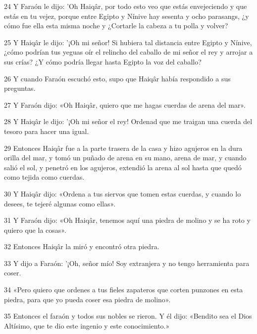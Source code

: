 \par 24 Y Faraón le dijo: 'Oh Haiqâr, por todo esto veo que estás envejeciendo y que estás en tu vejez, porque entre Egipto y Nínive hay sesenta y ocho parasangs, ¿y cómo fue ella esta misma noche y ¿Cortarle la cabeza a tu polla y volver?

\par 25 Y Haiqâr le dijo: '¡Oh mi señor! Si hubiera tal distancia entre Egipto y Nínive, ¿cómo podrían tus yeguas oír el relincho del caballo de mi señor el rey y arrojar a sus crías? ¿Y cómo podría llegar hasta Egipto la voz del caballo?

\par 26 Y cuando Faraón escuchó esto, supo que Haiqâr había respondido a sus preguntas.

\par 27 Y Faraón dijo: «Oh Haiqâr, quiero que me hagas cuerdas de arena del mar».

\par 28 Y Haiqâr le dijo: '¡Oh mi señor el rey! Ordenad que me traigan una cuerda del tesoro para hacer una igual.

\par 29 Entonces Haiqâr fue a la parte trasera de la casa y hizo agujeros en la dura orilla del mar, y tomó un puñado de arena en su mano, arena de mar, y cuando salió el sol, y penetró en los agujeros, extendió la arena al sol hasta que quedó como tejida como cuerdas.

\par 30 Y Haiqâr dijo: «Ordena a tus siervos que tomen estas cuerdas, y cuando lo desees, te tejeré algunas como ellas».

\par 31 Y Faraón dijo: «Oh Haiqâr, tenemos aquí una piedra de molino y se ha roto y quiero que la cosas».

\par 32 Entonces Haiqâr la miró y encontró otra piedra.

\par 33 Y dijo a Faraón: '¡Oh, señor mío! Soy extranjera y no tengo herramienta para coser.

\par 34 «Pero quiero que ordenes a tus fieles zapateros que corten punzones en esta piedra, para que yo pueda coser esa piedra de molino».

\par 35 Entonces el faraón y todos sus nobles se rieron. Y él dijo: «Bendito sea el Dios Altísimo, que te dio este ingenio y este conocimiento.»

